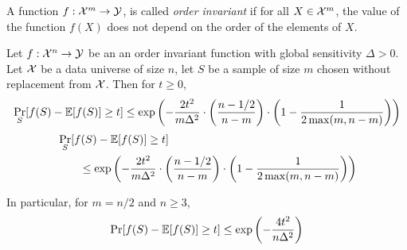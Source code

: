 

\begin{definition}\label{def:data-order-invariant-function}
    A function $f:\mathcal{X}^m \to \mathcal{Y}$, is called \emph{order invariant} if for all $X \in \mathcal{X}^m$, the value of the function $f(X)$ does not depend on the order of the elements of $X$. 
\end{definition}

\begin{theorem}\label{thm:mcdiarmids_without-our-version}
    Let $f:\mathcal{X}^n \to \mathcal{Y}$ be an an order invariant function with global sensitivity $\Delta > 0$. Let $\mathcal{X}$ be a data universe of size $n$, let $S$ be a sample of size $m$ chosen without replacement from $\mathcal{X}$. Then for $t \geq 0$,
    \ifnum{}
        $$\Pr_S [f(S)-\mathbb{E}[f(S)] \geq t] \leq \exp\left(-\frac{2t^2}{m\Delta^2}\cdot\left(\frac{n-1/2}{n-m}\right)\cdot\left(1-\frac{1}{2\max(m,n-m)}\right)\right)$$
    \else
    \begin{align*}
    & \Pr_S [f(S)-\mathbb{E}[f(S)] \geq t] \\
    & \qquad \leq \exp\left(-\frac{2t^2}{m\Delta^2}\cdot\left(\frac{n-1/2}{n-m}\right)\cdot\left(1-\frac{1}{2\max(m,n-m)}\right)\right)
    \end{align*}
    
    \fi    

    In particular, for $m = n/2$ and $n \geq 3$,
        $$\Pr[f(S)-\mathbb{E}[f(S)] \geq t] \leq \exp\left(-\frac{4t^2}{n\Delta^2}\right)$$
\end{theorem}

